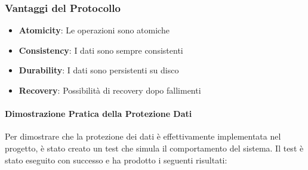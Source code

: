 \documentclass[12pt,a4paper]{article}
\begin{document}
\subsubsection{Vantaggi del Protocollo}

\begin{itemize}
\item \textbf{Atomicity}: Le operazioni sono atomiche
\item \textbf{Consistency}: I dati sono sempre consistenti
\item \textbf{Durability}: I dati sono persistenti su disco
\item \textbf{Recovery}: Possibilità di recovery dopo fallimenti
\end{itemize}

\paragraph{Dimostrazione Pratica della Protezione Dati}

Per dimostrare che la protezione dei dati è effettivamente implementata nel progetto, è stato creato un test che simula il comportamento del sistema. Il test è stato eseguito con successo e ha prodotto i seguenti risultati:
\end{document}
